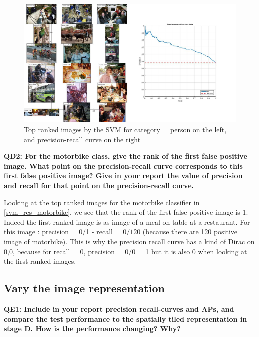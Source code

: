 \documentclass[a4paper,11pt]{exam}
\begin{document}
\begin{figure}[!h]
\centering
\includegraphics[width=13cm]{figures/svm_res_person.jpg}
\caption{Top ranked images by the SVM for category = person on the left, and precision-recall curve on the right}    
\label{svm_res_person}
\end{figure}

\textbf{QD2: For the motorbike class, give the rank of the first false positive image. What point on the precision-recall curve corresponds to this first false positive image? Give in your report the value of precision and recall for that point on the precision-recall curve.\\}

Looking at the top ranked images for the motorbike classifier in \ref{svm_res_motorbike}, we see that the rank of the first false positive image is 1. Indeed the first ranked image is as image of a meal on table at a restaurant. For this image : precision = 0/1 - recall = $0/120$ (because there are 120 positive image of motorbike). This is why the precision recall curve has a kind of Dirac on 0,0, because for recall = 0, precision = 0/0 = 1 but it is also 0 when looking at the first ranked images.\\

\clearpage

\subsection{Vary the image representation}

\textbf{QE1: Include in your report precision recall-curves and APs, and compare the test performance to the spatially tiled representation in stage D. How is the performance changing? Why?\\}
\end{document}
